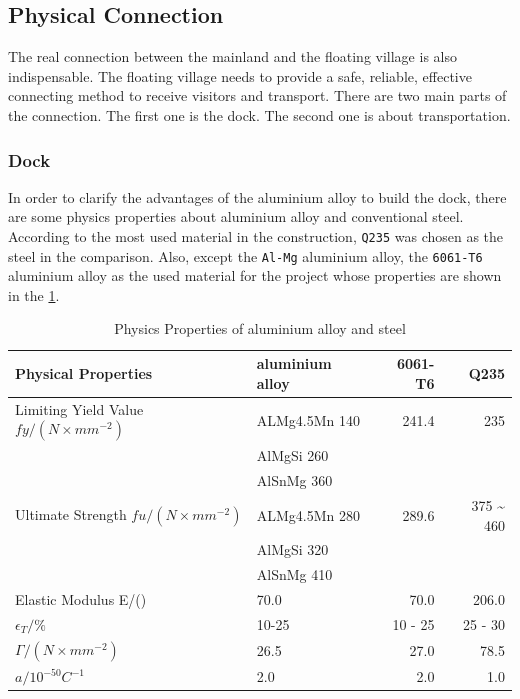 \documentclass[11pt]{article}
\numberwithin{equation}{section}
\begin{document}
\subsection{Physical Connection}
\label{sec:org83d5ee9}
The real connection between the mainland and the floating village is also indispensable. The floating village needs to provide a safe, reliable, effective connecting method to receive visitors and transport. There are two main parts of the connection. The first one is the dock. The second one is about transportation.

\subsubsection{Dock}
\label{sec:orgab611f0}
In order to clarify the advantages of the aluminium alloy to build the dock, there are some physics properties about aluminium alloy and conventional steel. According to the most used material in the construction, \texttt{Q235} was chosen as the steel in the comparison. Also, except the \texttt{Al-Mg} aluminium alloy, the \texttt{6061-T6} aluminium alloy as the used material for the project whose properties are shown in the  \ref{Physics_Properties_of_aluminium_alloy_and_steel}.

\begin{table}[H]
\caption{\label{Physics_Properties_of_aluminium_alloy_and_steel}Physics Properties of aluminium alloy and steel \cite{10.2749/101686606778995119}}
\centering
\begin{tabular}{llrr}
\toprule
Physical Properties & aluminium alloy & 6061-T6 & Q235\\
\midrule
Limiting Yield Value \(fy /(N\times mm^{-2} )\) & ALMg4.5Mn 140 & 241.4 & 235\\
 & AlMgSi 260 &  & \\
 & AlSnMg 360 &  & \\
\midrule
Ultimate Strength \(fu/(N\times mm^{-2} )\) & ALMg4.5Mn 280 & 289.6 & 375 \textasciitilde{} 460\\
 & AlMgSi 320 &  & \\
 & AlSnMg 410 &  & \\
\midrule
Elastic Modulus E/() & 70.0 & 70.0 & 206.0\\
\(\epsilon_T/\%\) & 10-25 & 10 - 25 & 25 - 30\\
\(\Gamma /(N\times mm^{-2})\) & 26.5 & 27.0 & 78.5\\
\(a/10^{-50}C^{-1}\) & 2.0 & 2.0 & 1.0\\
\bottomrule
\end{tabular}
\end{table}
\end{document}

